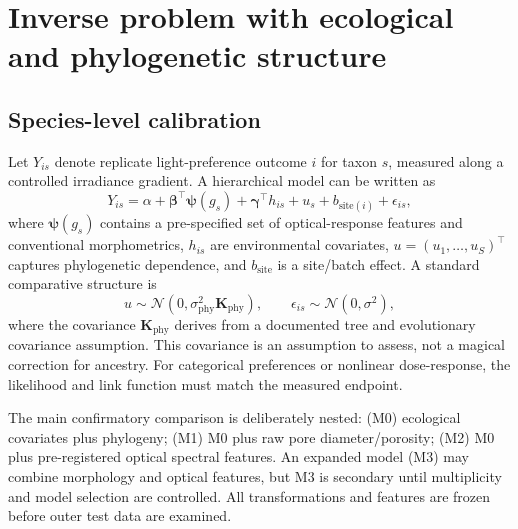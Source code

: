 \documentclass[11pt,a4paper]{article}
\newcommand{\Kphy}{\mathbf{K}_{\!\mathrm{phy}}}
\begin{document}
\section{Inverse problem with ecological and phylogenetic structure}
\subsection{Species-level calibration}
Let $Y_{is}$ denote replicate light-preference outcome $i$ for taxon $s$, measured along a controlled irradiance gradient. A hierarchical model can be written as
\begin{equation}
Y_{is}=\alpha+\bm{\beta}^{\top}\bm{\psi}(g_s)+\bm{\gamma}^{\top}h_{is}+u_s+b_{\mathrm{site}(i)}+\epsilon_{is},
\label{eq:hier}
\end{equation}
where $\bm{\psi}(g_s)$ contains a pre-specified set of optical-response features and conventional morphometrics, $h_{is}$ are environmental covariates, $u=(u_1,\ldots,u_S)^\top$ captures phylogenetic dependence, and $b_{\mathrm{site}}$ is a site/batch effect. A standard comparative structure is
\begin{equation}
u\sim\mathcal{N}(0,\sigma^2_{\mathrm{phy}}\Kphy),\qquad\epsilon_{is}\sim\mathcal{N}(0,\sigma^2),
\label{eq:phylo}
\end{equation}
where the covariance $\Kphy$ derives from a documented tree and evolutionary covariance assumption. This covariance is an assumption to assess, not a magical correction for ancestry. For categorical preferences or nonlinear dose-response, the likelihood and link function must match the measured endpoint.

The main confirmatory comparison is deliberately nested: (M0) ecological covariates plus phylogeny; (M1) M0 plus raw pore diameter/porosity; (M2) M0 plus pre-registered optical spectral features. An expanded model (M3) may combine morphology and optical features, but M3 is secondary until multiplicity and model selection are controlled. All transformations and features are frozen before outer test data are examined.
\end{document}
